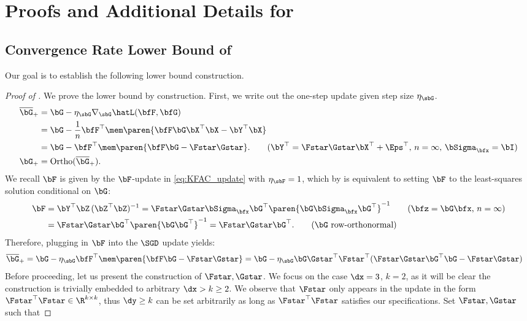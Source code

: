 \section{Proofs and Additional Details for }

\subsection{Convergence Rate Lower Bound of \SGD}\label{sec:SGD_lower_bound}

Our goal is to establish the following lower bound construction.
\LinRepLowerBound*

\begin{proof}[Proof of ]
    We prove the lower bound by construction. First, we write out the one-step \SGD update given step size $\eta_\sbG$.
    \begin{align*}
        \overline\bG_+ &= \bG - \eta_\sbG  \nabla_{\sbG} \hatL(\bfF, \bfG) \\
        &= \bG - \frac{1}{n}\bfF^\top \mem\paren{\bfF \bG \bX^\top \bX - \bY^\top \bX} \\
        &= \bG - \bfF^\top \mem\paren{\bfF\bG - \Fstar \Gstar }. \tag{$\bY^\top  = \Fstar \Gstar \bX^\top + \Eps^\top$, $n = \infty$, $\bSigma_\bfx = \bI$} \\
        \bG_+ &= \mathrm{Ortho}(\overline\bG_+).
    \end{align*}
    We recall $\bF$ is given by the $\bF$-update in \eqref{eq:KFAC_update} with $\eta_\sbF = 1$, which by  is equivalent to setting $\bF$ to the least-squares solution conditional on $\bG$:
    \begin{align*}
        \bF &= \bY^\top \bZ \, (\bZ^\top \bZ)^{-1} = \Fstar\Gstar \bSigma_\bfx \bG^\top \paren{\bG \bSigma_\bfx \bG^\top}^{-1} \tag{$\bfz = \bG \bfx$, $n = \infty$} \\
        &= \Fstar\Gstar \bG^\top \paren{\bG \bG^\top}^{-1} = \Fstar\Gstar \bG^\top. \tag{$\bG$ row-orthonormal}
    \end{align*}
    Therefore, plugging in $\bF$ into the $\SGD$ update yields:
    \begin{align*}
        \overline\bG_+ &= \bG - \eta_\sbG \bfF^\top \mem\paren{\bfF\bG - \Fstar \Gstar}= \bG - \eta_\sbG \bG \Gstar^\top \Fstar^\top (\Fstar\Gstar \bG^\top \bG - \Fstar \Gstar)
    \end{align*}
    Before proceeding, let us present the construction of $\Fstar, \Gstar$. We focus on the case $\dx = 3$, $k = 2$, as it will be clear the construction is trivially embedded to arbitrary $\dx > k \geq 2$. We observe that $\Fstar$ only appears in the \SGD update in the form $\Fstar^\top \Fstar \in \R^{k \times k}$, thus $\dy \geq k$ can be set arbitrarily as long as $\Fstar^\top \Fstar$ satisfies our specifications. Set $\Fstar, \Gstar$ such that

\end{proof}
